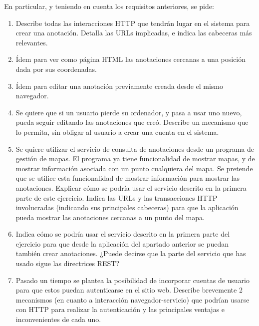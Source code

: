 En particular, y teniendo en cuenta los requisitos anteriores,
se pide:

\begin{enumerate}
\item Describe todas las interacciones HTTP que tendrán lugar en el sistema
  para crear una anotación. Detalla las URLs implicadas, e indica las cabeceras más relevantes.
\item Ídem para ver como página HTML las anotaciones cercanas a una
  posición dada por sus coordenadas.
\item Ídem para editar una anotación previamente creada desde el mismo
  navegador.
\item Se quiere que si un usuario pierde su ordenador, y pasa a usar
  uno nuevo, pueda seguir editando las anotaciones que creó. Describe
  un mecanismo que lo permita, sin obligar al usuario a crear una
  cuenta en el sistema.
\item Se quiere utilizar el servicio de consulta de anotaciones desde
  un programa de gestión de mapas. El programa ya tiene funcionalidad
  de mostrar mapas, y de mostrar información asociada con un punto
  cualquiera del mapa. Se pretende que se utilice esta funcionalidad
  de mostrar información para mostrar las anotaciones. Explicar cómo
  se podría usar el servicio descrito en la primera parte de este
  ejercicio. Indica las URLs y las transacciones HTTP involucradas
  (indicando sus principales cabeceras) para que la aplicación pueda
  mostrar las anotaciones cercanas a un punto del mapa.
\item Indica cómo se podría usar el servicio descrito en la primera
  parte del ejercicio para que desde la aplicación
  del apartado anterior se puedan también crear anotaciones. ¿Puede
  decirse que la parte del servicio que has usado sigue las
  directrices REST?
\item Pasado un tiempo se plantea la posibilidad de incorporar cuentas
  de usuario para que estos puedan autenticarse en el sitio web.
  Describe brevemente 2 mecanismos (en cuanto a interacción
  navegador-servicio) que podrían usarse con HTTP para realizar la
  autenticación y las principales ventajas e inconvenientes de cada
  uno.
\end{enumerate}

\newpage

